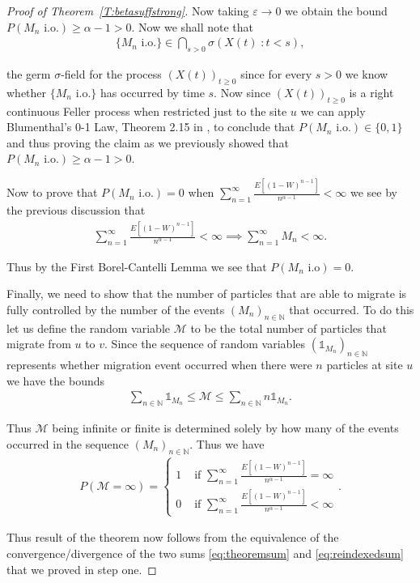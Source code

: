 \documentclass[11pt]{article}
\theoremstyle{definition}
\newcommand{\N}{\mathbb{N}}
\newcommand{\thmref}[1]{Theorem~\ref{T:#1}}
\begin{document}
\begin{proof}[Proof of \thmref{betasuffstrong}]
    \noindent Now taking $\varepsilon \to 0$ we obtain the bound $P(M_n \text{ i.o.}) \geq \alpha -1 > 0$. Now we shall note that
    \begin{align*}
        \{M_n \text{ i.o.}\} \in \bigcap_{s > 0} \sigma(X(t)\; \colon t < s),
    \end{align*}

    \noindent the germ $\sigma$-field for the process $(X(t))_{t \geq 0}$ since for every $s > 0$ we know whether $\{M_n \text{ i.o.}\}$ has occurred by time $s$. Now since $(X(t))_{t \geq 0}$ is a right continuous Feller process when restricted just to the site $u$ we can apply Blumenthal's 0-1 Law, Theorem 2.15 in \cite{revuzandyor}, to conclude that $P(M_n \text{ i.o.}) \in \{0,1\}$ and thus proving the claim as we previously showed that $P(M_n \text{ i.o.}) \geq \alpha -1 > 0$.
    \medskip

    \noindent Now to prove that $P(M_n \text{ i.o.}) = 0$ when $\sum_{n=1}^\infty \frac{E[(1-W)^{n-1}]}{n^{\alpha-1}} < \infty$ we see by the previous discussion that
    \begin{align*}
        \sum_{n=1}^\infty \frac{E[(1-W)^{n-1}]}{n^{\alpha-1}} < \infty  \implies \sum_{n = 1}^\infty M_n < \infty.
    \end{align*}

    \noindent Thus by the First Borel-Cantelli Lemma we see that $P(M_n \text{ i.o}) = 0$.
    \medskip

    \noindent Finally, we need to show that the number of particles that are able to migrate is fully controlled by the number of the events $(M_n)_{n \in \N}$ that occurred. To do this let us define the random variable $\mathcal{M}$ to be the total number of particles that migrate from $u$ to $v$. Since the sequence of random variables $(\mathds{1}_{M_n})_{n \in \N}$ represents whether migration event occurred when there were $n$ particles at site $u$ we have the bounds
    \begin{align*}
        \sum_{n \in \N} \mathds{1}_{M_n} \leq \mathcal{M} \leq \sum_{n \in \N} n\mathds{1}_{M_n}.
    \end{align*}

    \noindent Thus $\mathcal{M}$ being infinite or finite is determined solely by how many of the events occurred in the sequence $(M_n)_{n \in\N}$. Thus we have
    \begin{align*}
        P(\mathcal{M} = \infty) = \begin{cases}
            1 & \text{ if } \sum_{n=1}^\infty \frac{E[(1-W)^{n-1}]}{n^{\alpha-1}} = \infty\\
            0 & \text{ if } \sum_{n=1}^\infty \frac{E[(1-W)^{n-1}]}{n^{\alpha-1}} < \infty
        \end{cases}.
    \end{align*}

    \noindent Thus result of the theorem now follows from the equivalence of the convergence/divergence of the two sums \eqref{eq:theoremsum} and \eqref{eq:reindexedsum} that we proved in step one.
\end{proof}
\end{document}
